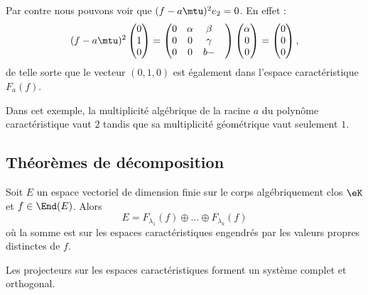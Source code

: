 \begin{remark}
	Par contre nous pouvons voir que \( (f-a\mtu)^2e_2=0\). En effet :
	\begin{equation}
		(f-a\mtu)^2\begin{pmatrix}
			0 \\
			1 \\
			0
		\end{pmatrix}=\begin{pmatrix}
			0 & \alpha & \beta    \\
			0 & 0      & \gamma   \\
			0 & 0      & b-     &
		\end{pmatrix}\begin{pmatrix}
			\alpha \\
			0      \\
			0
		\end{pmatrix}=\begin{pmatrix}
			0 \\
			0 \\
			0
		\end{pmatrix},
	\end{equation}
	de telle sorte que le vecteur \( (0,1,0)\) est également dans l'espace caractéristique \( F_a(f)\).

	Dans cet exemple, la multiplicité algébrique de la racine \( a\) du polynôme caractéristique vaut \( 2\) tandis que sa multiplicité géométrique vaut seulement \( 1\).
\end{remark}

\subsection{Théorèmes de décomposition}

\begin{theorem}     \label{ThoSpectraluRMLok}
	Soit \( E\) un espace vectoriel de dimension finie sur le corps algébriquement clos \( \eK\) et \( f\in\End(E)\). Alors
	\begin{equation}    \label{EqCTFHooBSGhYK}
		E=F_{\lambda_1}(f)\oplus\ldots\oplus F_{\lambda_k}(f)
	\end{equation}
	où la somme est sur les espaces caractéristiques engendrés par les valeurs propres distinctes de \( f\).

	Les projecteurs sur les espaces caractéristiques forment un système complet et orthogonal.
\end{theorem}

